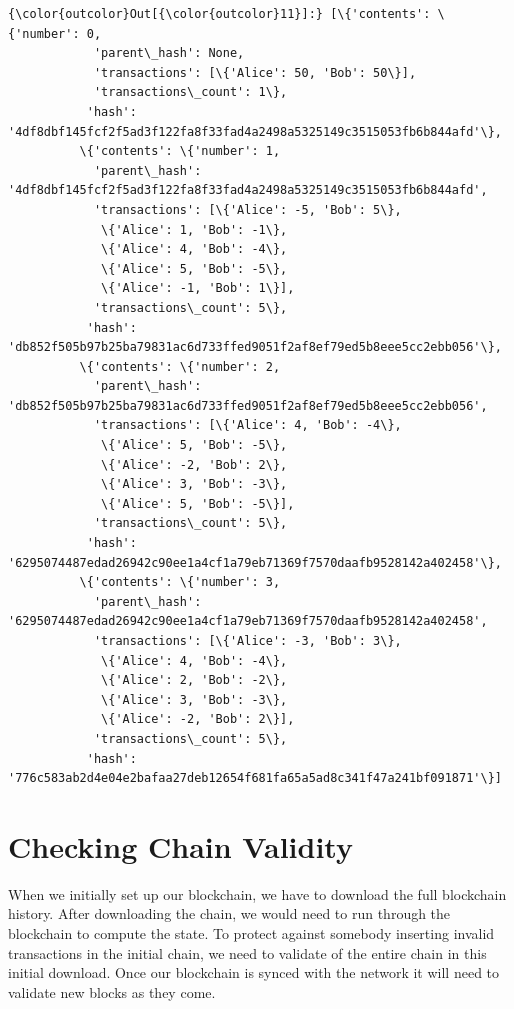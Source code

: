 \documentclass[11pt]{article}
\begin{document}
\begin{Verbatim}[commandchars=\\\{\}]
{\color{outcolor}Out[{\color{outcolor}11}]:} [\{'contents': \{'number': 0,
            'parent\_hash': None,
            'transactions': [\{'Alice': 50, 'Bob': 50\}],
            'transactions\_count': 1\},
           'hash': '4df8dbf145fcf2f5ad3f122fa8f33fad4a2498a5325149c3515053fb6b844afd'\},
          \{'contents': \{'number': 1,
            'parent\_hash': '4df8dbf145fcf2f5ad3f122fa8f33fad4a2498a5325149c3515053fb6b844afd',
            'transactions': [\{'Alice': -5, 'Bob': 5\},
             \{'Alice': 1, 'Bob': -1\},
             \{'Alice': 4, 'Bob': -4\},
             \{'Alice': 5, 'Bob': -5\},
             \{'Alice': -1, 'Bob': 1\}],
            'transactions\_count': 5\},
           'hash': 'db852f505b97b25ba79831ac6d733ffed9051f2af8ef79ed5b8eee5cc2ebb056'\},
          \{'contents': \{'number': 2,
            'parent\_hash': 'db852f505b97b25ba79831ac6d733ffed9051f2af8ef79ed5b8eee5cc2ebb056',
            'transactions': [\{'Alice': 4, 'Bob': -4\},
             \{'Alice': 5, 'Bob': -5\},
             \{'Alice': -2, 'Bob': 2\},
             \{'Alice': 3, 'Bob': -3\},
             \{'Alice': 5, 'Bob': -5\}],
            'transactions\_count': 5\},
           'hash': '6295074487edad26942c90ee1a4cf1a79eb71369f7570daafb9528142a402458'\},
          \{'contents': \{'number': 3,
            'parent\_hash': '6295074487edad26942c90ee1a4cf1a79eb71369f7570daafb9528142a402458',
            'transactions': [\{'Alice': -3, 'Bob': 3\},
             \{'Alice': 4, 'Bob': -4\},
             \{'Alice': 2, 'Bob': -2\},
             \{'Alice': 3, 'Bob': -3\},
             \{'Alice': -2, 'Bob': 2\}],
            'transactions\_count': 5\},
           'hash': '776c583ab2d4e04e2bafaa27deb12654f681fa65a5ad8c341f47a241bf091871'\}]
\end{Verbatim}
            
    \section{Checking Chain Validity}\label{checking-chain-validity}

When we initially set up our blockchain, we have to download the full
blockchain history. After downloading the chain, we would need to run
through the blockchain to compute the state. To protect against somebody
inserting invalid transactions in the initial chain, we need to validate
of the entire chain in this initial download. Once our blockchain is
synced with the network it will need to validate new blocks as they
come.
\end{document}
